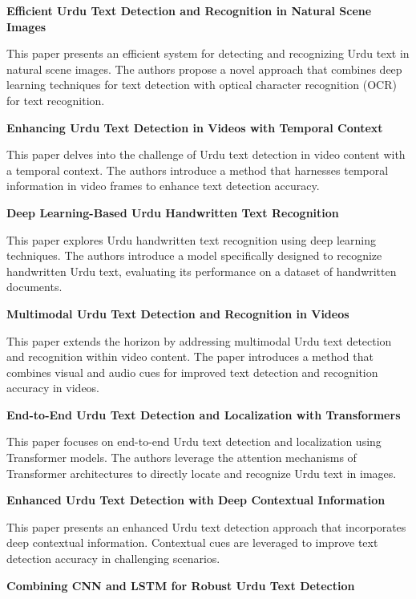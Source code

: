 \textbf{Efficient Urdu Text Detection and Recognition in Natural Scene Images \cite{efficient-urdu-detection-recognition}}

This paper presents an efficient system for detecting and recognizing Urdu text in natural scene images. The authors propose a novel approach that combines deep learning techniques for text detection with optical character recognition (OCR) for text recognition.

\textbf{Enhancing Urdu Text Detection in Videos with Temporal Context \cite{urdu-text-detection-temporal-context}}

This paper delves into the challenge of Urdu text detection in video content with a temporal context. The authors introduce a method that harnesses temporal information in video frames to enhance text detection accuracy.

\textbf{Deep Learning-Based Urdu Handwritten Text Recognition \cite{urdu-handwritten-text-recognition}}

This paper explores Urdu handwritten text recognition using deep learning techniques. The authors introduce a model specifically designed to recognize handwritten Urdu text, evaluating its performance on a dataset of handwritten documents.

\textbf{Multimodal Urdu Text Detection and Recognition in Videos \cite{multimodal-urdu-text-detection-recognition}}

This paper extends the horizon by addressing multimodal Urdu text detection and recognition within video content. The paper introduces a method that combines visual and audio cues for improved text detection and recognition accuracy in videos.

\textbf{End-to-End Urdu Text Detection and Localization with Transformers \cite{urdu-text-detection-transformers}}

This paper focuses on end-to-end Urdu text detection and localization using Transformer models. The authors leverage the attention mechanisms of Transformer architectures to directly locate and recognize Urdu text in images.

\textbf{Enhanced Urdu Text Detection with Deep Contextual Information \cite{enhanced-urdu-text-detection-contextual}}

This paper presents an enhanced Urdu text detection approach that incorporates deep contextual information. Contextual cues are leveraged to improve text detection accuracy in challenging scenarios.

\textbf{Combining CNN and LSTM for Robust Urdu Text Detection \cite{cnn-lstm-robust-urdu-text-detection}}

